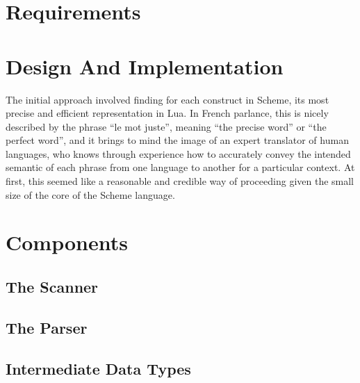 \section{Requirements}


\section{Design And Implementation}

The initial approach involved finding for each construct in Scheme, its most
precise and efficient representation in Lua. In French parlance, this is nicely
described by the phrase ``le mot juste'', meaning ``the precise word'' or ``the
perfect word'', and it brings to mind the image of an expert translator of
human languages, who knows through experience how to accurately convey the
intended semantic of each phrase from one language to another for a particular
context.  At first, this seemed like a reasonable and credible way of
proceeding given the small size of the core of the Scheme language.


\section{Components}

\subsection{The Scanner}

\subsection{The Parser}

\subsection{Intermediate Data Types}
